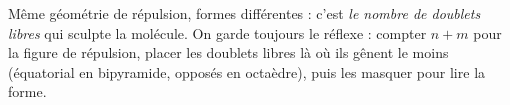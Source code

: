 \documentclass[11pt,a4paper]{article}
\begin{document}
\begin{astucebox}
Même géométrie de répulsion, formes différentes : c'est \emph{le nombre de doublets libres} qui
sculpte la molécule. On garde toujours le réflexe : compter $n+m$ pour la figure de répulsion,
placer les doublets libres là où ils gênent le moins (équatorial en bipyramide, opposés en
octaèdre), puis les masquer pour lire la forme.
\end{astucebox}
\end{document}
